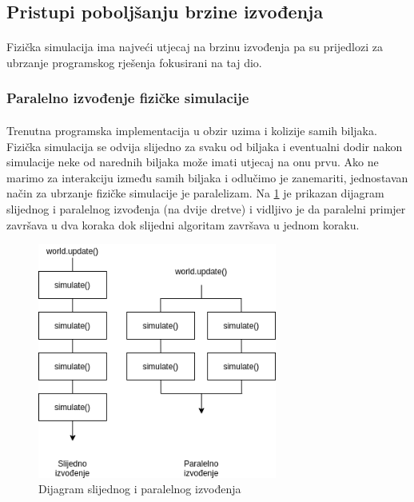 \documentclass[times, utf8, diplomski]{fer}
\begin{document}
\subsection{Pristupi poboljšanju brzine izvođenja}
\paragraph{}
Fizička simulacija ima najveći utjecaj na brzinu izvođenja pa su prijedlozi za 
ubrzanje programskog rješenja fokusirani na taj dio.
\subsubsection{Paralelno izvođenje fizičke simulacije}
\paragraph{}
Trenutna programska implementacija u obzir uzima i kolizije samih biljaka. 
Fizička simulacija se odvija slijedno za svaku od biljaka i eventualni dodir 
nakon simulacije neke od narednih biljaka može imati utjecaj na onu prvu. Ako
ne marimo za interakciju između samih biljaka i odlučimo je zanemariti, 
jednostavan način za ubrzanje fizičke simulacije je paralelizam. Na \ref{fig:531-1} je 
prikazan dijagram slijednog i paralelnog izvođenja (na dvije dretve) i vidljivo je da 
paralelni primjer završava u dva koraka dok slijedni algoritam završava u jednom koraku.

\begin{figure}[h]
	\centering
	\includegraphics[width=0.7\textwidth]{img/531-1}
	\caption{Dijagram slijednog i paralelnog izvođenja}
	\label{fig:531-1}
\end{figure}
\end{document}
